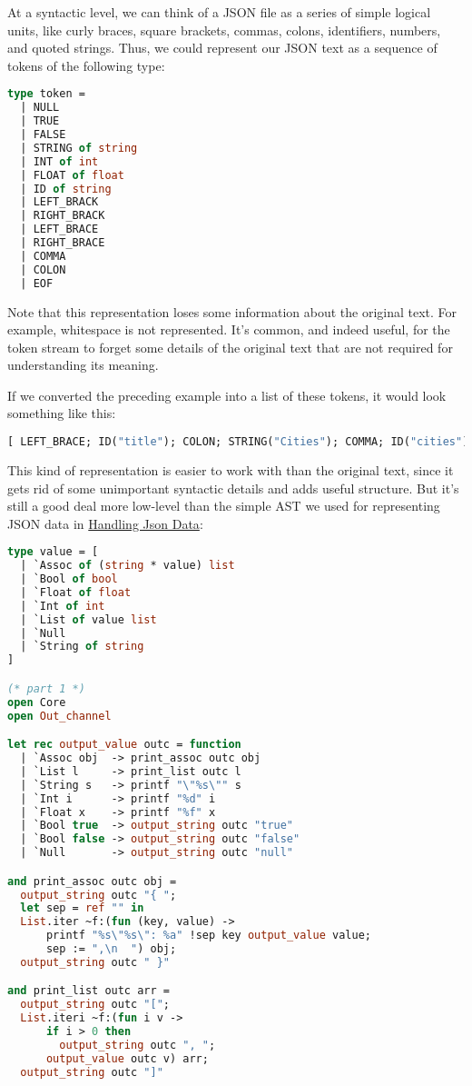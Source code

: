 At a syntactic level, we can think of a JSON file as a series of simple
logical units, like curly braces, square brackets, commas, colons,
identifiers, numbers, and quoted strings. Thus, we could represent our
JSON text as a sequence of tokens of the following type:

\begin{lstlisting}[language=Caml]
type token =
  | NULL
  | TRUE
  | FALSE
  | STRING of string
  | INT of int
  | FLOAT of float
  | ID of string
  | LEFT_BRACK
  | RIGHT_BRACK
  | LEFT_BRACE
  | RIGHT_BRACE
  | COMMA
  | COLON
  | EOF
\end{lstlisting}

Note that this representation loses some information about the original
text. For example, whitespace is not represented. It's common, and
indeed useful, for the token stream to forget some details of the
original text that are not required for understanding its meaning.

If we converted the preceding example into a list of these tokens, it
would look something like this:

\begin{lstlisting}[language=Caml]
[ LEFT_BRACE; ID("title"); COLON; STRING("Cities"); COMMA; ID("cities"); ...
\end{lstlisting}

This kind of representation is easier to work with than the original
text, since it gets rid of some unimportant syntactic details and adds
useful structure. But it's still a good deal more low-level than the
simple AST we used for representing JSON data in
\href{json.html\#handling-json-data}{Handling Json Data}:

\begin{lstlisting}[language=Caml]
type value = [
  | `Assoc of (string * value) list
  | `Bool of bool
  | `Float of float
  | `Int of int
  | `List of value list
  | `Null
  | `String of string
]

(* part 1 *)
open Core
open Out_channel

let rec output_value outc = function
  | `Assoc obj  -> print_assoc outc obj
  | `List l     -> print_list outc l
  | `String s   -> printf "\"%s\"" s
  | `Int i      -> printf "%d" i
  | `Float x    -> printf "%f" x
  | `Bool true  -> output_string outc "true"
  | `Bool false -> output_string outc "false"
  | `Null       -> output_string outc "null"

and print_assoc outc obj =
  output_string outc "{ ";
  let sep = ref "" in
  List.iter ~f:(fun (key, value) ->
      printf "%s\"%s\": %a" !sep key output_value value;
      sep := ",\n  ") obj;
  output_string outc " }"

and print_list outc arr =
  output_string outc "[";
  List.iteri ~f:(fun i v ->
      if i > 0 then
        output_string outc ", ";
      output_value outc v) arr;
  output_string outc "]"
\end{lstlisting}

